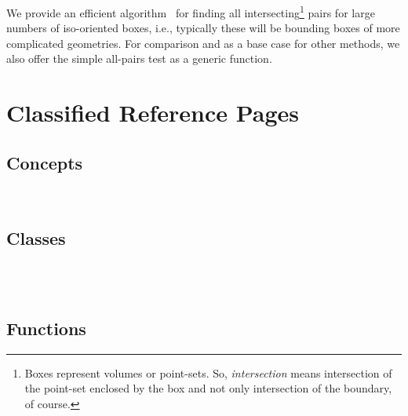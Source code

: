 



We provide an efficient algorithm~\cite{cgal:ze-fsbi-02} for finding all
intersecting\footnote{Boxes represent volumes or point-sets. So, \textit{intersection} means intersection of the point-set enclosed by the box and not only intersection of the boundary, of course.} pairs for large numbers of iso-oriented boxes, i.e.,
typically these will be bounding boxes of more complicated geometries.
For comparison and as a base case for other methods, we also offer the
simple all-pairs test as a generic function.


\section{Classified Reference Pages}

\subsection*{Concepts}

\\

\subsection*{Classes}

\\
\\

\subsection*{Functions}

